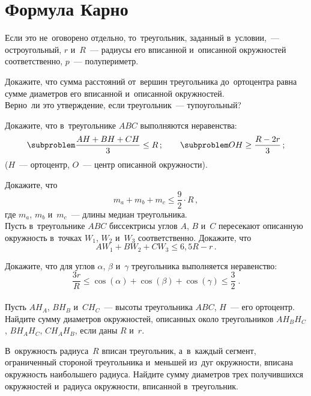 
\section*{Формула Карно}


Если это не~оговорено отдельно, то~треугольник, заданный в~условии,~---
остроугольный, $r$ и~$R$~--- радиусы его вписанной и~описанной окружностей
соответственно, $p$~--- полупериметр.

\begin{problems}

\item
\subproblem
Докажите, что сумма расстояний от~вершин треугольника до~ортоцентра равна сумме
диаметров его вписанной и~описанной окружностей.
\\
\subproblem
Верно~ли это утверждение, если треугольник~--- тупоугольный?

\item
Докажите, что в~треугольнике $ABC$ выполняются неравенства:
\[
\text{\subproblem}
    \frac{AH + BH + CH}{3} \leq R
\,;\qquad
\text{\subproblem}
    OH \geq \frac{R - 2 r}{3}
\,;\]
($H$~--- ортоцентр, $O$~--- центр описанной окружности).

\item
\subproblem
Докажите, что
\[
    m_a + m_b + m_c
\leq
    \frac{9}{2} \cdot R
\,,\]
где $m_a$, $m_b$ и~$m_c$~--- длины медиан треугольника.
\\
\subproblem
Пусть в~треугольнике $ABC$ биссектрисы углов $A$, $B$ и~$C$ пересекают
описанную окружность в~точках $W_1$, $W_2$ и~$W_3$ соответственно.
Докажите, что
\[
    A W_1 + B W_2 + C W_3
\leq
    6{,}5 R - r
\,.\]

\item
\subproblem
Докажите, что для углов $\alpha$, $\beta$ и~$\gamma$ треугольника выполняется
неравенство:
\[
    \frac{3 r}{R}
\leq
    \cos(\alpha) + \cos(\beta) + \cos(\gamma)
\leq
    \frac{3}{2}
\;.\]
\\
\subproblem
Пусть $A H_A$, $B H_B$ и~$C H_C$~--- высоты треугольника $ABC$, $H$~---
его ортоцентр.
Найдите сумму диаметров окружностей, описанных около треугольников
$A H_B H_C$, $B H_A H_C$, $C H_A H_B$, если даны $R$ и~$r$.

\item
В~окружность радиуса~$R$ вписан треугольник, а~в~каждый сегмент, ограниченный
стороной треугольника и~меньшей из~дуг окружности, вписана окружность
наибольшего радиуса.
Найдите сумму диаметров трех получившихся окружностей и~радиуса окружности,
вписанной в~треугольник.


\end{problems}
